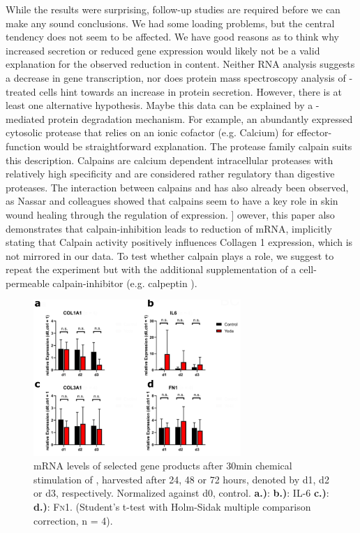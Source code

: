 While the results were surprising, follow-up studies are required before we can make any sound conclusions. We had some loading problems, but the central tendency does not seem to be affected. We have good reasons as to think why increased secretion or reduced gene expression would likely not be a valid explanation for the observed reduction in \colone{} content. Neither RNA analysis suggests a decrease in gene transcription, nor does protein mass spectroscopy analysis of \Yoda{}-treated cells hint towards an increase in protein secretion. However, there is at least one alternative hypothesis. Maybe this data can be explained by a \Piezo{}-mediated protein degradation mechanism. For example, an abundantly expressed cytosolic protease that relies on an ionic cofactor (e.g. Calcium) for effector-function would be straightforward explanation. The protease family calpain suits this description. \cite{Goll2003} Calpains are calcium dependent intracellular proteases with relatively high specificity and are considered rather regulatory than digestive proteases. The interaction between calpains and \colone has also already been observed, as Nassar and colleagues showed that calpains seem to have a key role in skin wound healing through the regulation of \colone{} expression. \cite{Nassar2012}] owever, this paper also demonstrates that calpain-inhibition leads to reduction of \colone{} mRNA, implicitly stating that Calpain activity positively influences Collagen 1 expression, which is not mirrored in our data. To test whether calpain plays a role, we suggest to repeat the experiment but with the additional supplementation of a cell-permeable calpain-inhibitor (e.g. calpeptin \cite{Schoenwaelder1999}).

\begin{figure}[ht]
\centering
\includegraphics[width = 0.7\textwidth]{NormalYodaExp_PCR.png}
\caption{mRNA levels of selected gene products after 30min chemical stimulation of \Piezo{}, harvested after 24, 48 or 72 hours, denoted by d1, d2 or d3, respectively. Normalized against d0, control.\hfill \newline
\textbf{a.)}: \colone{}
\textbf{b.)}: IL-6
\textbf{c.)}: \colthree{}
\textbf{d.)}: \textsc{Fn}1. 
(Student's t-test with Holm-Sidak multiple comparison correction, n = 4). 
}
\label{fig:Yoda_Norm_PCR}
\end{figure}


